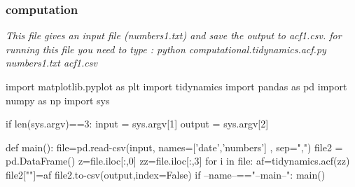 \documentclass[12pt, a4paper, twoside]{report}
\begin{document}
\subsubsection{computation}
 
\textit{This file gives an input file (numbers1.txt) and save the output to acf1.csv.\newline
for running this file you need to type : python computational.tidynamics.acf.py numbers1.txt acf1.csv\newline}



import matplotlib.pyplot as plt\newline
import tidynamics\newline
import pandas as pd\newline
import numpy as np\newline
import sys\newline

if len(sys.argv)==3:\newline
\hspace*{10mm} input = sys.argv[1]\newline
\hspace*{10mm} output = sys.argv[2]\newline


def main():\newline
\hspace*{10mm}    file=pd.read-csv(input, names=['date','numbers'] , sep=",") \newline
\hspace*{10mm}    file2 = pd.DataFrame()\newline
\hspace*{10mm}    z=file.iloc[:,0]\newline
\hspace*{10mm}    zz=file.iloc[:,3]\newline\newline
\hspace*{10mm}    for i in file:\newline
\hspace*{20mm}        af=tidynamics.acf(zz)\newline
\hspace*{10mm}    file2[""]=af\newline
\hspace*{10mm}   file2.to-csv(output,index=False) \newline
if --name--=="--main--":\newline
\hspace*{10mm}    main()\par
\end{document}
